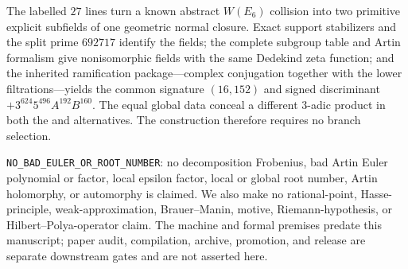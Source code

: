 The labelled $27$ lines turn a known abstract $W(E_6)$ collision into two
primitive explicit subfields of one geometric normal closure.  Exact support
stabilizers and the split prime $692717$ identify the fields; the complete
subgroup table and Artin formalism give nonisomorphic fields with the same
Dedekind zeta function; and the inherited ramification package---complex
conjugation together with the lower filtrations---yields the common signature
$(16,152)$ and signed discriminant
$+3^{624}5^{496}A^{192}B^{160}$.  The equal global data conceal a different
$3$-adic product in both the  and  alternatives.  The
construction therefore requires no branch selection.

\noindent\texttt{NO\_BAD\_EULER\_OR\_ROOT\_NUMBER}: no decomposition Frobenius,
bad Artin Euler polynomial or factor, local epsilon factor, local or global
root number, Artin holomorphy, or automorphy is claimed.  We also make no
rational-point, Hasse-principle, weak-approximation, Brauer--Manin, motive,
Riemann-hypothesis, or Hilbert--Polya-operator claim.  The machine and formal
premises predate this manuscript; paper audit, compilation, archive,
promotion, and release are separate downstream gates and are not asserted
here.
